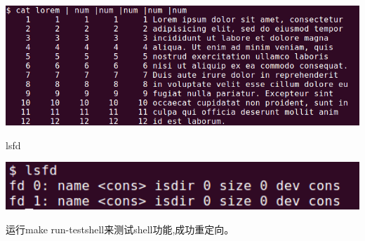 \begin{ExerciseList}
  \includegraphics[width=6in]{figures/lab5/image101.png}

  lsfd

  \includegraphics[width=6in]{figures/lab5/image102.png}


  运行make run-testshell来测试shell功能,成功重定向。

\end{ExerciseList}
